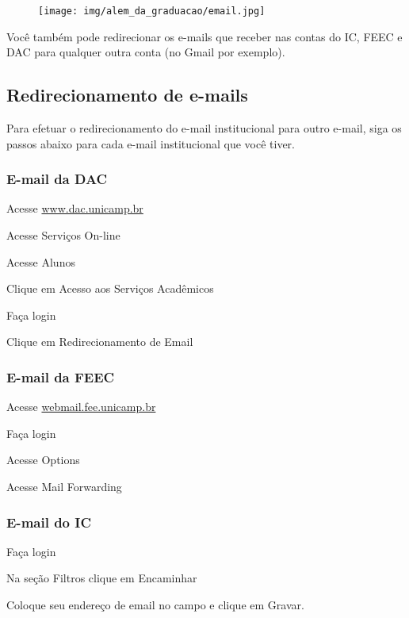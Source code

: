\begin{figure}[b!]
    \centering
    \texttt{[image: img/alem\_da\_graduacao/email.jpg]}
\end{figure}
Você também pode redirecionar os e-mails que receber nas contas do IC, FEEC e
DAC para qualquer outra conta (no Gmail por exemplo).

\subsection{Redirecionamento de e-mails}
Para efetuar o redirecionamento do e-mail institucional para outro e-mail, siga
os passos abaixo para cada e-mail institucional que você tiver.

\subsubsection{E-mail da DAC}

\begin{compactenumerate}
    \item  Acesse \url{www.dac.unicamp.br}
    \item  Acesse Serviços On-line
    \item  Acesse Alunos
    \item  Clique em Acesso aos Serviços Acadêmicos
    \item  Faça login
    \item  Clique em Redirecionamento de Email
\end{compactenumerate}

\subsubsection{E-mail da FEEC}

\begin{compactenumerate}
    \item  Acesse \url{webmail.fee.unicamp.br}
    \item  Faça login
    \item  Acesse Options
    \item  Acesse Mail Forwarding
\end{compactenumerate}

\subsubsection{E-mail do IC}

\begin{compactenumerate}
    \item  {}
    \item  Faça login
    \item  Na seção Filtros clique em Encaminhar
    \item  Coloque seu endereço de email no campo e clique em Gravar.
\end{compactenumerate}

